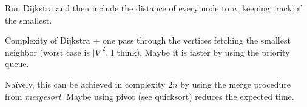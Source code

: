 

Run Dijkstra and then include the distance of every node to $u$, keeping track of the smallest.


Complexity of Dijkstra + one pass through the vertices fetching the smallest neighbor (worst case is $|V|^2$, I think). Maybe it is faster by using the priority queue.



Naïvely, this can be achieved in complexity $2n$ by using the merge procedure from \emph{mergesort}. 
Maybe using pivot (see quicksort) reduces the expected time.




